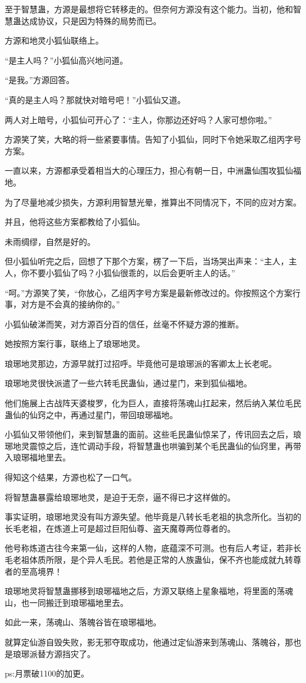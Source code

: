 \begin{this_body}
至于智慧蛊，方源是最想将它转移走的。但奈何方源没有这个能力。当初，他和智慧蛊达成协议，只是因为特殊的局势而已。

方源和地灵小狐仙联络上。

“是主人吗？”小狐仙高兴地问道。

“是我。”方源回答。

“真的是主人吗？那就快对暗号吧！”小狐仙又道。

两人对上暗号，小狐仙可开心了：“主人，你那边还好吗？人家可想你啦。”

方源笑了笑，大略的将一些紧要事情。告知了小狐仙，同时下令她采取乙组丙字号方案。

一直以来，方源都承受着相当大的心理压力，担心有朝一日，中洲蛊仙围攻狐仙福地。

为了尽量地减少损失，方源利用智慧光晕，推算出不同情况下，不同的应对方案。

并且，他将这些方案都教给了小狐仙。

未雨绸缪，自然是好的。

但小狐仙听完之后，回想了下那个方案，楞了一下后，当场哭出声来：“主人，主人，你不要小狐仙了吗？小狐仙很乖的，以后会更听主人的话。”

“呵。”方源笑了笑，“你放心，乙组丙字号方案是最新修改过的。你按照这个方案行事，对方是不会真的接纳你的。”

小狐仙破涕而笑，对方源百分百的信任，丝毫不怀疑方源的推断。

她按照方案行事，联络上了琅琊地灵。

琅琊地灵那边，方源早就打过招呼。毕竟他可是琅琊派的客卿太上长老呢。

琅琊地灵很快派遣了一些六转毛民蛊仙，通过星门，来到狐仙福地。

他们施展上古战阵天婆梭罗，化为巨人，直接将荡魂山扛起来，然后纳入某位毛民蛊仙的仙窍之中，再通过星门，带回琅琊福地。

小狐仙又带领他们，来到智慧蛊的面前。这些毛民蛊仙惊呆了，传讯回去之后，琅琊地灵震惊之后，连忙调动手段，将智慧蛊也哄骗到某个毛民蛊仙的仙窍里，再带入琅琊福地里去。

得知这个结果，方源也松了一口气。

将智慧蛊暴露给琅琊地灵，是迫于无奈，逼不得已才这样做的。

事实证明，琅琊地灵没有叫方源失望。他毕竟是八转长毛老祖的执念所化。当初的长毛老祖，在炼道上可是超过巨阳仙尊、盗天魔尊两位尊者的。

他号称炼道古往今来第一仙，这样的人物，底蕴深不可测。也有后人考证，若非长毛老祖体质所限，是个异人毛民。若他是正常的人族蛊仙，保不齐也能成就九转尊者的至高境界！

琅琊地灵将智慧蛊挪移到琅琊福地之后，方源又联络上星象福地，将里面的荡魂山，也一同搬迁到琅琊福地里去。

如此一来，荡魂山、落魄谷皆在琅琊福地。

就算定仙游自毁失败，影无邪夺取成功，他通过定仙游来到荡魂山、落魄谷，那也是琅琊派替方源挡灾了。

ps:月票破1100的加更。

\end{this_body}

